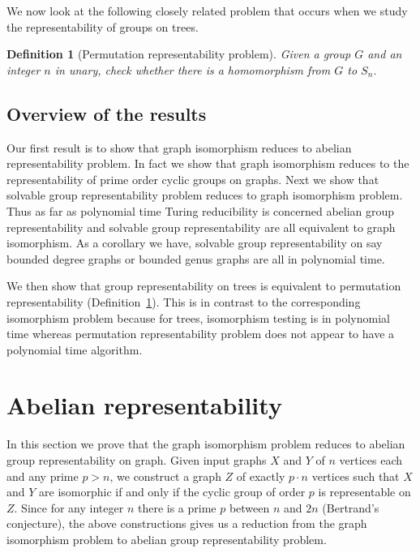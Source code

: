 \documentclass[a4paper,11pt]{article}
\newtheorem{definition}[theorem]{Definition}
\begin{document}
We now look at the following closely related problem that occurs
when we study the representability of groups on trees.

\begin{definition}[Permutation representability problem] 
  \label{def-perm-representability}
  Given a group $G$ and an integer $n$ in unary, check whether there is
  a homomorphism from $G$ to $S_n$.
\end{definition}

\subsection*{Overview of the results}

Our first result is to show that graph isomorphism reduces to abelian
representability problem. In fact we show that graph isomorphism
reduces to the representability of prime order cyclic groups on
graphs. Next we show that solvable group representability problem
reduces to graph isomorphism problem. Thus as far as polynomial time
Turing reducibility is concerned abelian group representability and
solvable group representability are all equivalent to graph
isomorphism. As a corollary we have, solvable group representability on
say bounded degree graphs or bounded genus graphs are all in
polynomial time.

We then show that group representability on trees is equivalent to
permutation representability
(Definition~\ref{def-perm-representability}). This is in contrast to
the corresponding isomorphism problem because for trees, isomorphism
testing is in polynomial time whereas permutation representability
problem does not appear to have a polynomial time algorithm.

\section{Abelian representability}

In this section we prove that the graph isomorphism problem reduces to
abelian group representability on graph. Given input graphs $X$ and
$Y$ of $n$ vertices each and any prime $p > n$, we construct a graph
$Z$ of exactly $p \cdot n$ vertices such that $X$ and $Y$ are
isomorphic if and only if the cyclic group of order $p$ is
representable on $Z$. Since for any integer $n$ there is a
prime $p$ between $n$ and $2n$ (Bertrand's conjecture), the above
constructions gives us a reduction from the graph isomorphism problem
to abelian group representability problem.
\end{document}
